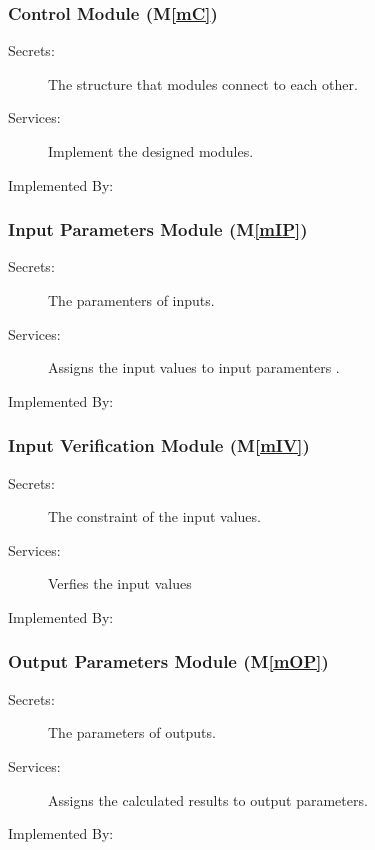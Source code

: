 \documentclass[12pt, titlepage]{article}
\newcommand{\mref}[1]{M\ref{#1}}
\begin{document}
\subsubsection{Control Module (\mref{mC}) }

\begin{description}
\item[Secrets:] The structure that modules connect to each other.
\item[Services:] Implement the designed modules.
\item[Implemented By:] \progname
\end{description}

\subsubsection{Input Parameters Module (\mref{mIP})}

\begin{description}
\item[Secrets:] The paramenters  of inputs.
\item[Services:] Assigns the input values to input paramenters .

\item[Implemented By:] \progname
\end{description}


\subsubsection{Input Verification Module (\mref{mIV})}

\begin{description}
\item[Secrets:] The constraint of the input values.
\item[Services:] Verfies  the input values
\item[Implemented By:] \progname
\end{description}

\subsubsection{Output Parameters Module (\mref{mOP})}

\begin{description}
\item[Secrets:] The parameters of outputs.
\item[Services:] Assigns the calculated results to output parameters.
\item[Implemented By:] \progname
\end{description}
\end{document}
